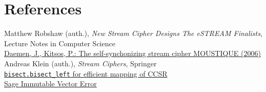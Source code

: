 \documentclass[a4paper,10pt]{article}
\begin{document}
\section{References}
Matthew Robshaw (auth.), \textit{New Stream Cipher Designs The eSTREAM Finalists}, Lecture Notes in Computer Science\\
\href{http://www.ecrypt.eu.org/stream/p3ciphers/mosquito/mosquito_p3.pdf}{Daemen, J., Kitsos, P.: The self-synchonizing stream cipher MOUSTIQUE (2006)}\\
Andreas Klein (auth.), \textit{Stream Ciphers}, Springer\\
\href{https://stackoverflow.com/a/37873955/13746066}{\texttt{bisect.bisect\_left} for efficient mapping of CCSR}\\
\href{https://stackoverflow.com/a/29303791/13746066}{Sage Immutable Vector Error}
\end{document}
